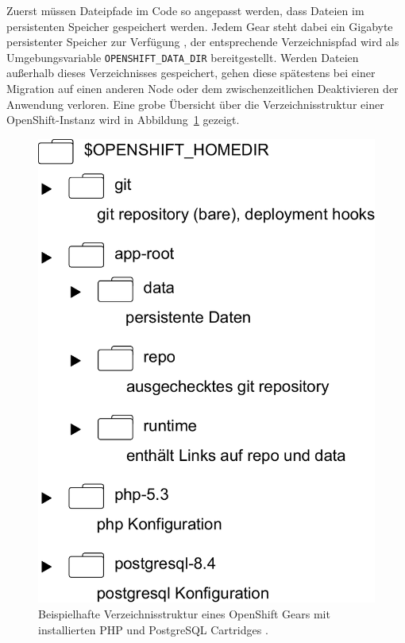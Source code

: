 \documentclass[10pt,a4paper,compsoc]{IEEEtran}
\begin{document}
Zuerst müssen Dateipfade im Code so angepasst werden, dass Dateien im persistenten Speicher gespeichert werden. Jedem Gear steht dabei ein Gigabyte persistenter Speicher zur Verfügung \cite[S. 14]{os_user_guide}, der entsprechende Verzeichnispfad wird als Umgebungsvariable \verb!OPENSHIFT_DATA_DIR! bereitgestellt. Werden Dateien außerhalb dieses Verzeichnisses gespeichert, gehen diese spätestens bei einer Migration auf einen anderen Node oder dem zwischenzeitlichen Deaktivieren der Anwendung verloren. Eine grobe Übersicht über die Verzeichnisstruktur einer OpenShift-Instanz wird in Abbildung~\ref{fig:directories} gezeigt.
\begin{figure}[htbp]
\centering
\includegraphics[width=0.7\linewidth]{imgs/directories}
\caption{Beispielhafte Verzeichnisstruktur eines OpenShift Gears mit installierten PHP und PostgreSQL Cartridges \cite{os_architecture}.}
\label{fig:directories}
\end{figure}
\end{document}
